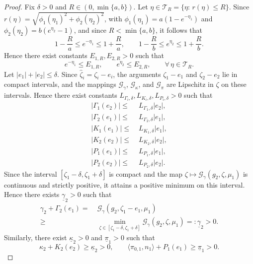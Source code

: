 \documentclass[10pt,a4paper]{amsart}
\begin{document}
\begin{proof}
Fix $\delta>0$ and $R\in(0,\min\{a,b\})$. Let $\eta\in\mathcal T_{R}=\{\eta:\,r(\eta)\le R\}$. Since $r(\eta)=\sqrt{\phi_1(\eta_1)^2+\phi_2(\eta_2)^2}$, with $\phi_1(\eta_1)=a(1-e^{-\eta_1})$ and $\phi_2(\eta_2)=b(e^{\eta_2}-1)$, and since $R<\min\{a,b\}$, it follows that
\begin{equation}
1-\frac{R}{a}\le e^{-\eta_1}\le 1+\frac{R}{a},\qquad
1-\frac{R}{b}\le e^{\eta_2}\le 1+\frac{R}{b}.
\end{equation}
Hence there exist constants $E_{1,R},E_{2,R}>0$ such that
\begin{equation}
e^{-\eta_1}\le E_{1,R},\qquad e^{\eta_2}\le E_{2,R},\qquad \forall\,\eta\in\mathcal T_{R}.
\end{equation}
Let $|e_1|+|e_2|\le\delta$. Since $\hat\zeta_i=\zeta_i-e_i$, the arguments $\zeta_1-e_1$ and $\zeta_2-e_2$ lie in compact intervals, and the mappings $\mathcal{G}_\gamma$, $\mathcal{G}_\kappa$, and $\mathcal{G}_\pi$ are Lipschitz in $\zeta$ on these intervals. Hence there exist constants $L_{\Gamma_i,\delta},L_{K_i,\delta},L_{P_i,\delta}>0$ such that
\begin{align}
|\Gamma_1(e_2)|\le&\; L_{\Gamma_1,\delta}|e_2|,\\
|\Gamma_2(e_1)|\le&\; L_{\Gamma_2,\delta}|e_1|,\\
|K_1(e_1)|\le&\; L_{K_1,\delta}|e_1|, \\ 
|K_2(e_2)|\le&\; L_{K_2,\delta}|e_2|, \\ 
|P_1(e_1)|\le&\; L_{P_1,\delta}|e_1|, \\ 
|P_2(e_2)|\le&\; L_{P_2,\delta}|e_2|.
\end{align}
Since the interval $[\zeta_1-\delta,\zeta_1+\delta]$ is compact and the map 
$\zeta \mapsto \mathcal{G}_\gamma(g_2,\zeta,\mu_1)$ is continuous and strictly positive, it attains a positive minimum on this interval. 
Hence there exists $\underline{\gamma}_2>0$ such that
\begin{align}
\label{eq-lower-gamma}
\gamma_2 + \Gamma_2(e_1) =\;& \nonumber  \mathcal{G}_\gamma(g_2,\zeta_1 - e_1,\mu_1) \\\ge\;&  \min_{\zeta \in [\zeta_1-\delta,\zeta_1+\delta]} \mathcal{G}_\gamma(g_2,\zeta,\mu_1) =: \underline{\gamma}_2 > 0.
\end{align}
Similarly, there exist $\underline{\kappa}_2>0$ and $\underline{\pi}_1>0$ such that
\begin{equation}
\label{eq-lower-bnd-kappa-pi}
\kappa_2+K_2(e_2)\ge \underline{\kappa}_2>0,\qquad
\langle \pi_{0,1},n_1\rangle+P_1(e_1)\ge \underline{\pi}_1>0.

\end{equation}
\end{proof}
\end{document}
